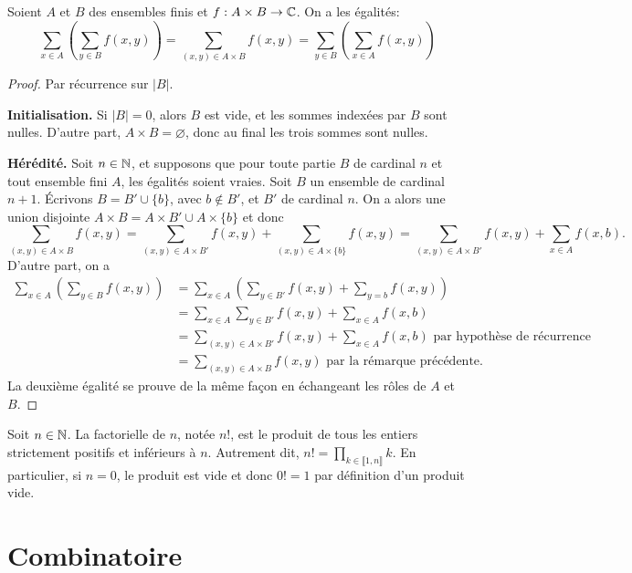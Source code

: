 \begin{theoreme}
Soient $A$ et $B$ des ensembles finis et $f : A\times B \to \mathbb{C}$. On a les égalités:
\[
\sum_{x\in A}\left(\sum_{y\in B} f(x,y)\right)
=
\sum_{(x,y)\in A\times B} f(x,y)
=
\sum_{y\in B}\left(\sum_{x\in A} f(x,y)\right)
\]
\end{theoreme}
\begin{proof}
Par récurrence sur $|B|$. 

\noindent\textbf{Initialisation.} Si $|B|=0$, alors $B$ est vide, et les sommes indexées par $B$ sont nulles. D'autre part, $A\times B=\varnothing$, donc au final les trois sommes sont nulles.

\noindent\textbf{Hérédité.} Soit $n\in \mathbb{N}$, et supposons que pour toute partie $B$ de cardinal $n$ et tout ensemble fini $A$, les égalités soient vraies. Soit $B$ un ensemble de cardinal $n+1$. Écrivons $B = B'\cup \{b\}$, avec $b\not\in B'$, et $B'$ de cardinal $n$. On a alors une union disjointe $A\times B = A\times B' \cup A\times\{b\}$ et donc
\[ 
\sum_{(x,y)\in A\times B}f(x,y)
=
\sum_{(x,y)\in A\times B'}f(x,y) + \sum_{(x,y)\in A\times \{b\}}f(x,y)
=
\sum_{(x,y)\in A\times B'}f(x,y) + \sum_{x\in A} f(x,b).
\]
D'autre part, on a 
\begin{align*}
\sum_{x\in A}\left(\sum_{y\in B}f(x,y)\right)
&=
\sum_{x\in A}\left(\sum_{y\in B'}f(x,y)+\sum_{y=b}f(x,y)\right)\\
&=
\sum_{x\in A}\sum_{y\in B'}f(x,y) + \sum_{x\in A}f(x,b)\\
&=
\sum_{(x,y)\in A\times B'}f(x,y) + \sum_{x\in A}f(x,b)\text{ par hypothèse de récurrence}\\
&=
\sum_{(x,y)\in A\times B} f(x,y) \text{ par la rémarque précédente}.
\end{align*}
La deuxième égalité se prouve de la même façon en échangeant les rôles de $A$ et $B$.
\end{proof}

\begin{definition}[Factorielle]
Soit $n\in \mathbb{N}$. La factorielle de $n$, notée $n!$, est le produit de tous les entiers strictement positifs et inférieurs à $n$. Autrement dit, $n! = \prod_{k \in \llbracket 1,n\rrbracket} k$. En particulier, si $n=0$, le produit est vide et donc $0!=1$ par définition d'un produit vide. 
\end{definition}


\section{Combinatoire}
